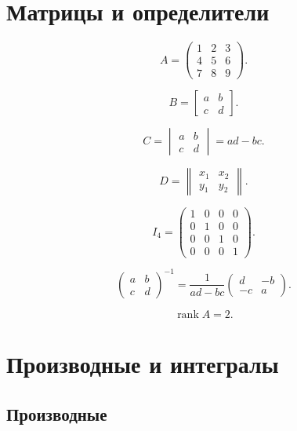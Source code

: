 \documentclass[12pt,a4paper]{article}
\theoremstyle{definition}
\theoremstyle{remark}
\DeclareMathOperator{\rank}{rank}
\begin{document}
\section{Матрицы и определители}

\[
A=
\begin{pmatrix}
    1 & 2 & 3\\
    4 & 5 & 6\\
    7 & 8 & 9
\end{pmatrix}.
\]

\[
B=
\begin{bmatrix}
    a & b\\
    c & d
\end{bmatrix}.
\]

\[
C=
\begin{vmatrix}
    a & b\\
    c & d
\end{vmatrix}
=
ad-bc.
\]

\[
D=
\begin{Vmatrix}
    x_1 & x_2\\
    y_1 & y_2
\end{Vmatrix}.
\]

\[
I_4=
\begin{pmatrix}
    1&0&0&0\\
    0&1&0&0\\
    0&0&1&0\\
    0&0&0&1
\end{pmatrix}.
\]

\[
\begin{pmatrix}
    a&b\\
    c&d
\end{pmatrix}^{-1}
=
\frac{1}{ad-bc}
\begin{pmatrix}
    d&-b\\
    -c&a
\end{pmatrix}.
\]

\[
\rank A=2.
\]


\section{Производные и интегралы}

\subsection{Производные}
\end{document}
